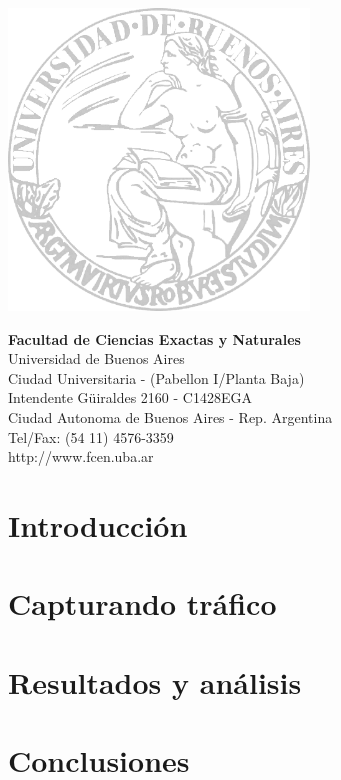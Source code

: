 \documentclass[a4paper]{article}
\begin{document}
\begin{multicols}{2}
\includegraphics[width=8cm]{caratula/logo-uba.png}

\columnbreak
\vspace*{4.5cm}
\raggedleft
\textbf{Facultad de Ciencias Exactas y Naturales}\\
Universidad de Buenos Aires\\
\small
Ciudad Universitaria - (Pabellon I/Planta Baja)\\
Intendente G\"uiraldes 2160 - C1428EGA\\
Ciudad Autonoma de Buenos Aires - Rep. Argentina\\
Tel/Fax: (54 11) 4576-3359\\
http://www.fcen.uba.ar
\end{multicols}

\restoregeometry

\clearpage


\tableofcontents

\vspace{3cm}

\clearpage

\setlength{\parindent}{10pt}

\section{Introducción}

\clearpage

\section{Capturando tráfico}

\clearpage

\section{Resultados y análisis}

\clearpage

\section{Conclusiones}

\end{document}
